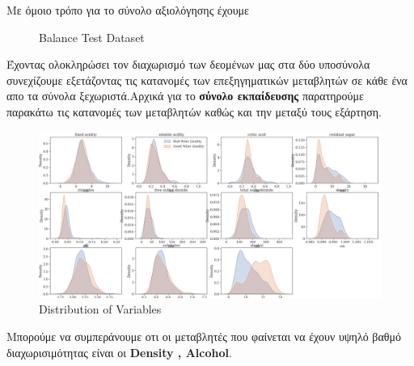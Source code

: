 \documentclass[12pt,a4paper]{article}
\begin{document}
\newpage
Με όμοιο τρόπο για το σύνολο αξιολόγησης έχουμε
\begin{figure}[H]
    \centering
    \qquad
    \caption{Balance Test Dataset}%
    \label{fig:example}%
\end{figure}

Έχοντας ολοκληρώσει τον διαχωρισμό των δεομένων μας στα δύο υποσύνολα συνεχίζουμε εξετάζοντας τις κατανομές των επεξηγηματικών μεταβλητών σε κάθε ένα απο τα σύνολα ξεχωριστά.Αρχικά για το \textbf{σύνολο εκπαίδευσης} παρατηρούμε παρακάτω τις κατανομές των μεταβλητών καθώς και την μεταξύ τους εξάρτηση.

\begin{figure}[H]
\centering
\includegraphics[width=0.70\linewidth,height=0.50\textheight]{Images/plot7}
\caption{Distribution of Variables}
\label{fig:imagea}
\end{figure}


Μπορούμε να συμπεράνουμε οτι οι μεταβλητές που φαίνεται να έχουν υψηλό βαθμό διαχωρισιμότητας είναι οι \textbf{Density , Alcohol}.
\end{document}
